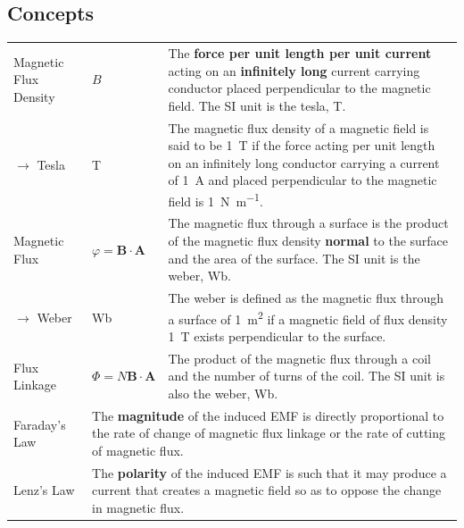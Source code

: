 \documentclass[a4paper,11pt]{article}
\begin{document}
	\subsection{Concepts}
	\begin{center}
		\renewcommand{\arraystretch}{1.2}
		\begin{tabular}{@{} l l p{8.6cm} @{}}
			\toprule
			Magnetic Flux Density & $B$ & The \textbf{force per unit length per unit current} acting on an \textbf{infinitely long} current carrying conductor placed perpendicular to the magnetic field. The SI unit is the tesla, \si{\tesla}. \\
			$\rightarrow$ Tesla & \si{\tesla} & The magnetic flux density of a magnetic field is said to be \SI{1}{\tesla} if the force acting per unit length on an infinitely long conductor carrying a current of \SI{1}{\ampere} and placed perpendicular to the magnetic field is \SI{1}{\newton\per\meter}. \\
			Magnetic Flux & $\varphi=\textbf{B}\cdot\textbf{A}$ & The magnetic flux through a surface is the product of the magnetic flux density \textbf{normal} to the surface and the area of the surface. The SI unit is the weber, \si{\weber}. \\
			$\rightarrow$ Weber & \si{\weber} & The weber is defined as the magnetic flux through a surface of \SI{1}{\meter\squared} if a magnetic field of flux density \SI{1}{\tesla} exists perpendicular to the surface.\\
			Flux Linkage & $\Phi=N\textbf{B}\cdot\textbf{A}$ & The product of the magnetic flux through a coil and the number of turns of the coil. The SI unit is also the weber, \si{\weber}. \\
			\midrule
			Faraday's Law & \multicolumn{2}{p{11.1cm}}{The \textbf{magnitude} of the induced EMF is directly proportional to the rate of change of magnetic flux linkage or the rate of cutting of magnetic flux.}\\
			Lenz's Law & \multicolumn{2}{p{11.1cm}}{The \textbf{polarity} of the induced EMF is such that it may produce a current that creates a magnetic field so as to oppose the change in magnetic flux. } \\
			\bottomrule
		\end{tabular}
	\end{center}
\end{document}
